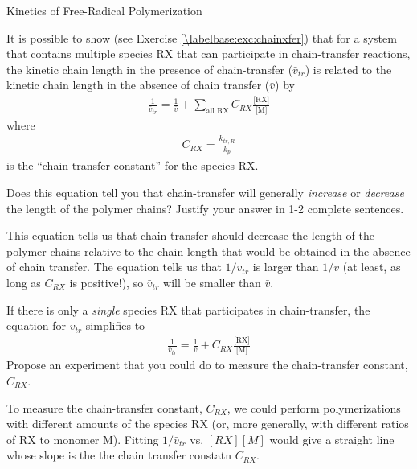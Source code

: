 \begin{activity}{Kinetics of Free-Radical Polymerization}
\begin{ctqs}
\begin{solution}[2in]
		\end{solution}
		
\end{ctqs}

\begin{infobox}
\label{\labelbase:info:vtr}

	It is possible to show (see Exercise \ref{\labelbase:exc:chainxfer}) that for a system that contains multiple species RX that can participate in chain-transfer reactions, the kinetic chain length in the presence of chain-transfer ($\bar v_{tr}$) is related to the kinetic chain length in the absence of chain transfer ($\bar v$) by
	\begin{align*}
		\frac{1}{\bar v_{tr}} = \frac{1}{\bar v} + \sum_{\text{all RX}} C_{RX}\frac{\text{[RX]}}{\text{[M]}}
	\end{align*}
	where
	\begin{align*}
		C_{RX} = \frac{k_{tr,R}}{k_p}
	\end{align*}
	is the ``chain transfer constant'' for the species RX.
	
\end{infobox}

\begin{ctqs}

	\question Does this equation tell you that chain-transfer will generally \emph{increase} or \emph{decrease} the length of the polymer chains?  Justify your answer in 1-2 complete sentences.
	
		\begin{solution}[2in]
			This equation tells us that chain transfer should decrease the length of the polymer chains relative to the chain length that would be obtained in the absence of chain transfer.  The equation tells us that $1/\bar v_{tr}$ is larger than $1/\bar v$ (at least, as long as $C_{RX}$ is positive!), so $\bar v_{tr}$ will be smaller than $\bar v$.
		\end{solution}
		
	\question If there is only a \emph{single} species RX that participates in chain-transfer, the equation for $v_{tr}$ simplifies to
	\begin{align*}
		\frac{1}{\bar v_{tr}} = \frac{1}{\bar v} + C_{RX}\frac{\text{[RX]}}{\text{[M]}}
	\end{align*}
		Propose an experiment that you could do to measure the chain-transfer constant, $C_{RX}$.
		
		\begin{solution}[2.5in]
			To measure the chain-transfer constant, $C_{RX}$, we could perform polymerizations with different amounts of the species RX (or, more generally, with different ratios of RX to monomer M).  Fitting $1/\bar v_{tr}$ vs. $[RX][M]$ would give a straight line whose slope is the the chain transfer constatn $C_{RX}$.
		\end{solution}
	

\end{ctqs}
\end{activity}
